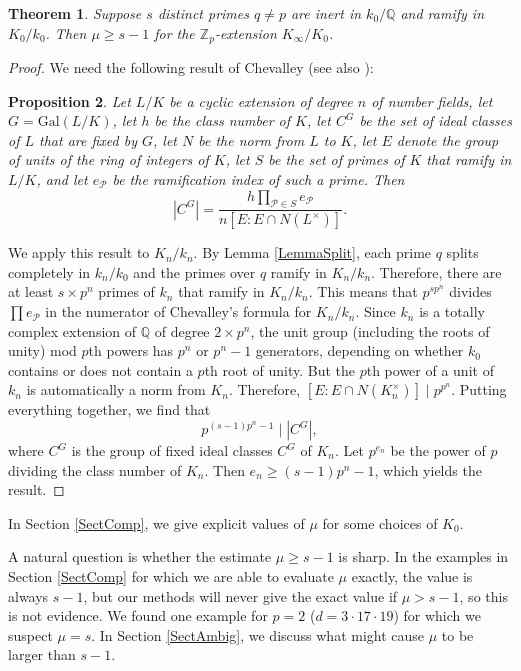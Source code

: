 \documentclass{amsart}
\newtheorem{theorem}{Theorem}
\newtheorem{proposition}[theorem]{Proposition}
\begin{document}
\begin{theorem}\label{Iw}
Suppose $s$ distinct primes $q\ne p$ are inert in $k_0/\mathbb Q$ and ramify in $K_0/k_0$.
 Then $\mu\ge s-1$ for the $\mathbb Z_p$-extension
$K_{\infty}/K_0$.
\end{theorem}
\begin{proof}
We need the following result of Chevalley \cite{Ch} (see also \cite{Lem}):
\begin{proposition}\label{Chev} Let $L/K$ be a cyclic extension of degree $n$ of number fields, let $G=\text{Gal}(L/K)$, let $h$ be the class number of $K$,
let $C^{G}$ be the set of ideal classes
of $L$ that are fixed by $G$, let $N$ be the norm from $L$ to $K$,  let $E$ denote the group of
units of the ring of integers of $K$, let $S$ be the set of
primes of $K$ that ramify in $L/K$, and let $e_{\mathcal{P}}$ be the ramification index of such a prime. Then
$$
|C^G| = \frac{h \prod_{{\mathcal{P}}\in S} e_{\mathcal{P}} }{n[E: E\cap N(L^{\times})]}.
$$
\end{proposition}

We apply this result to $K_n/k_n$.
 By Lemma \ref{LemmaSplit}, each prime $q$
splits completely in $k_n/k_0$ and the primes over $q$ ramify in $K_n/k_n$. Therefore, there are at least $s\times p^n$ primes of 
$k_n$ that ramify in $K_n/k_n$. This means that $p^{sp^n}$ divides  $\prod e_{\mathcal{P}}$ in the numerator of Chevalley's formula for $K_n/k_n$.
Since $k_n$ is a totally complex extension of $\mathbb Q$ of degree $2\times p^n$, the unit group (including the roots of unity) mod $p$th powers
has $p^n$ or $p^n-1$ generators, depending on whether $k_0$ contains or does not contain a $p$th root of unity. 
But the $p$th power of a unit of $k_n$ is automatically a norm from $K_n$. Therefore, $[E: E\cap N(K_n^{\times})]\mid p^{p^n}$.
Putting everything together, we find that 
$$
 p^{(s-1)p^n-1}\mid |C^G|,
$$
where  $C^G$ is the group of fixed ideal classes $C^G$ of $K_n$. Let $p^{e_n}$ be the power of $p$ dividing the class number of $K_n$.
Then $e_n\ge (s-1)p^n-1$, which yields the result.  \end{proof}

In Section \ref{SectComp}, we give 
explicit values of $\mu$ for some choices of $K_0$. 

A natural question is whether the estimate $\mu\ge s-1$ is sharp. In the examples in Section \ref{SectComp} for which we are able to evaluate $\mu$
exactly, the value is always $s-1$, but our methods will never give the exact value if $\mu > s-1$, so this is not evidence. We found
one example for $p=2$ ($d=3\cdot 17\cdot 19$) for which we suspect $\mu=s$. In Section \ref{SectAmbig},
we discuss what might cause $\mu$ to be larger than $s-1$.
\end{document}
